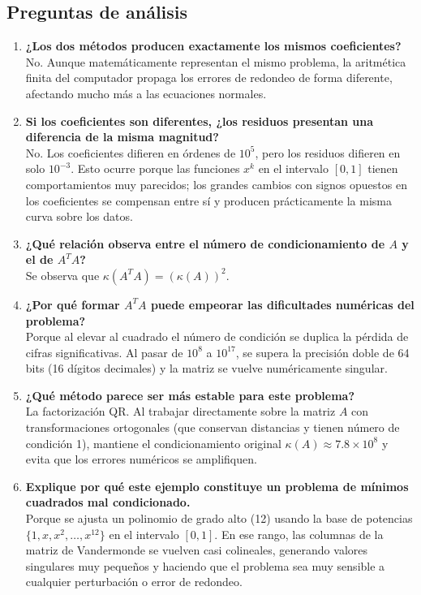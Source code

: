 \documentclass[11pt,a4paper]{article}
\begin{document}
\subsection{Preguntas de análisis}
\begin{enumerate}[leftmargin=*]
    \item \textbf{¿Los dos métodos producen exactamente los mismos coeficientes?} \\
    No. Aunque matemáticamente representan el mismo problema, la aritmética finita del computador propaga los errores de redondeo de forma diferente, afectando mucho más a las ecuaciones normales.
    
    \item \textbf{Si los coeficientes son diferentes, ¿los residuos presentan una diferencia de la misma magnitud?} \\
    No. Los coeficientes difieren en órdenes de $10^5$, pero los residuos difieren en solo $10^{-3}$. Esto ocurre porque las funciones $x^k$ en el intervalo $[0, 1]$ tienen comportamientos muy parecidos; los grandes cambios con signos opuestos en los coeficientes se compensan entre sí y producen prácticamente la misma curva sobre los datos.
    
    \item \textbf{¿Qué relación observa entre el número de condicionamiento de $A$ y el de $A^T A$?} \\
    Se observa que $\kappa(A^T A) = (\kappa(A))^2$.
    
    \item \textbf{¿Por qué formar $A^T A$ puede empeorar las dificultades numéricas del problema?} \\
    Porque al elevar al cuadrado el número de condición se duplica la pérdida de cifras significativas. Al pasar de $10^8$ a $10^{17}$, se supera la precisión doble de 64 bits (16 dígitos decimales) y la matriz se vuelve numéricamente singular.
    
    \item \textbf{¿Qué método parece ser más estable para este problema?} \\
    La factorización QR. Al trabajar directamente sobre la matriz $A$ con transformaciones ortogonales (que conservan distancias y tienen número de condición 1), mantiene el condicionamiento original $\kappa(A) \approx 7.8 \times 10^8$ y evita que los errores numéricos se amplifiquen.
    
    \item \textbf{Explique por qué este ejemplo constituye un problema de mínimos cuadrados mal condicionado.} \\
    Porque se ajusta un polinomio de grado alto (12) usando la base de potencias $\{1, x, x^2, \dots, x^{12}\}$ en el intervalo $[0, 1]$. En ese rango, las columnas de la matriz de Vandermonde se vuelven casi colineales, generando valores singulares muy pequeños y haciendo que el problema sea muy sensible a cualquier perturbación o error de redondeo.
\end{enumerate}
\end{document}
